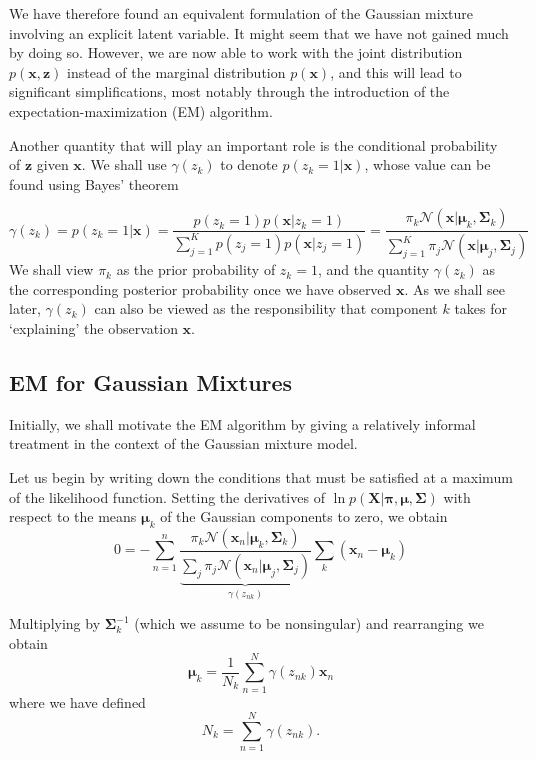 ﻿\documentclass[a4paper, 11pt]{article}
\numberwithin{equation}{subsection}
\begin{document}
We have therefore found an equivalent formulation of the Gaussian mixture involving an explicit latent variable. It might seem that we have not gained much by doing so. However, we are now able to work with the joint distribution $p(\mathbf x, \mathbf z)$ instead of the marginal distribution $p(\mathbf x)$, and this will lead to significant simplifications, most notably through the introduction of the expectation-maximization (EM) algorithm.

Another quantity that will play an important role is the conditional probability of $\mathbf z$ given $\mathbf x$. We shall use $\gamma(z_k)$ to denote $p(z_k=1|\mathbf x)$, whose value can be found using Bayes’ theorem

\begin{equation}
\gamma(z_k)=p(z_k=1|\mathbf x)=\frac{p(z_k=1)p(\mathbf x|z_k=1)}{\sum_{j=1}^Kp(z_j=1)p(\mathbf x|z_j=1)}=\frac{\pi_k\mathcal N(\mathbf x|\boldsymbol\mu_k,\boldsymbol\Sigma_k)}{\sum_{j=1}^K\pi_j\mathcal N(\mathbf x|\boldsymbol\mu_j,\boldsymbol\Sigma_j)}
\end{equation}
We shall view $\pi_k$ as the prior probability of $z_k=1$, and the quantity $\gamma(z_k)$ as the corresponding posterior probability once we have observed $\mathbf x$. As we shall see later, $\gamma(z_k)$ can also be viewed as the responsibility that component $k$ takes for ‘explaining’ the observation $\mathbf x$.




\subsection{EM for Gaussian Mixtures}
Initially, we shall motivate the EM algorithm by giving a relatively informal treatment in the context of the Gaussian mixture model.

Let us begin by writing down the conditions that must be satisfied at a maximum of the likelihood function. Setting the derivatives of $\ln p(\mathbf X|\boldsymbol\pi,\boldsymbol\mu,\boldsymbol\Sigma)$ with respect to the means $\boldsymbol\mu_k$ of the Gaussian components to zero, we obtain
\begin{equation}
0=-\sum_{n=1}^n\frac{\pi_k\mathcal N(\mathbf x_n|\boldsymbol\mu_k,\boldsymbol\Sigma_k)}{\underbrace{\sum_j\pi_j\mathcal N(\mathbf x_n|\boldsymbol\mu_j,\boldsymbol\Sigma_j)}_{\gamma(z_{nk})}}\sum_k(\mathbf x_n-\boldsymbol\mu_k)
\end{equation}

Multiplying by $\boldsymbol\Sigma_k^{-1}$ (which we assume to be nonsingular) and rearranging we obtain
\begin{equation}
\boldsymbol\mu_k=\frac{1}{N_k}\sum_{n=1}^N\gamma(z_{nk})\mathbf x_n
\end{equation}
where we have defined
\begin{equation}
 N_k=\sum_{n=1}^N\gamma(z_{nk}).
  \end{equation}
\end{document}
